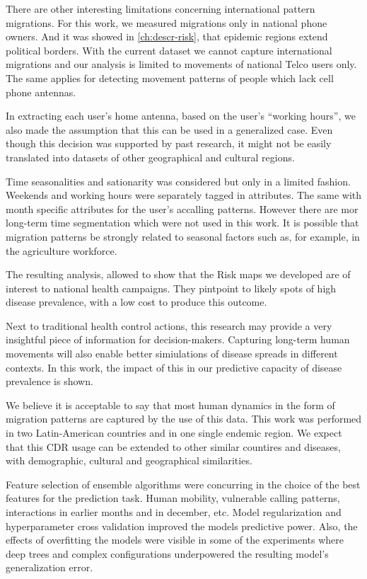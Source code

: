There are other interesting limitations concerning international pattern migrations.
For this work, we measured migrations only in national phone owners.
And it was showed in \cref{ch:descr-risk}, that  epidemic regions extend political borders.
With the current dataset we cannot capture international migrations and our analysis is limited to movements of national Telco users only.
The same applies for detecting movement patterns of people which lack cell phone antennas.

In extracting each user's home antenna, based on the user's ``working hours'', we also made the assumption that this can be used in a generalized case.
Even though this decision was supported by past research, it might not be easily translated into datasets of other geographical and cultural regions.

Time seasonalities and sationarity was considered but only in a limited fashion.
Weekends and working hours were separately tagged in attributes.
The same with month specific attributes for the user's accalling patterns.
However there are mor long-term time segmentation which were not used in this work.
It is possible that migration patterns be strongly related to seasonal factors such as, for example, in the agriculture workforce.



The resulting analysis, allowed to show that the Risk maps we developed are of interest to national health campaigns.
They pintpoint to likely spots of high disease prevalence, with a low cost to produce this outcome.

Next to traditional health control actions, this research may provide a very insightful piece of information for decision-makers.
Capturing long-term human movements will also enable better simiulations of disease spreads in different contexts.
In this work, the impact of this in our predictive capacity of disease prevalence is shown.





We believe it is acceptable to say that most human dynamics in the form of migration patterns are captured by the use of this data.
This work was performed in two Latin-American countries and in one single endemic region.
We expect that this CDR usage can be extended to other similar countires and diseases, with demographic, cultural and geographical similarities.


Feature selection of ensemble algorithms were concurring in the choice of the best features for the prediction task.
Human mobility, vulnerable calling patterns, interactions in earlier months and in december, etc.
Model regularization and hyperparameter cross validation improved the models predictive power.
Also, the effects of overfitting the models were visible in some of the experiments where deep trees and complex configurations underpowered the resulting model's generalization error.



